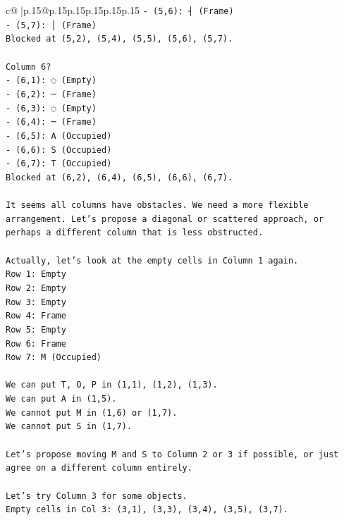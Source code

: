 \documentclass{article}
\begin{document}
{\begin{supertabular}{c@{$\;$}|p{.15\linewidth}@{}p{.15\linewidth}p{.15\linewidth}p{.15\linewidth}p{.15\linewidth}p{.15\linewidth}}
{{{\texttt{{-} (5,6): ┤ (Frame)} \\
\texttt{{-} (5,7): │ (Frame)} \\
\texttt{Blocked at (5,2), (5,4), (5,5), (5,6), (5,7).} \\
\\ 
\texttt{Column 6?} \\
\texttt{{-} (6,1): ◌ (Empty)} \\
\texttt{{-} (6,2): ─ (Frame)} \\
\texttt{{-} (6,3): ◌ (Empty)} \\
\texttt{{-} (6,4): ─ (Frame)} \\
\texttt{{-} (6,5): A (Occupied)} \\
\texttt{{-} (6,6): S (Occupied)} \\
\texttt{{-} (6,7): T (Occupied)} \\
\texttt{Blocked at (6,2), (6,4), (6,5), (6,6), (6,7).} \\
\\ 
\texttt{It seems all columns have obstacles. We need a more flexible arrangement. Let's propose a diagonal or scattered approach, or perhaps a different column that is less obstructed.} \\
\\ 
\texttt{Actually, let's look at the empty cells in Column 1 again.} \\
\texttt{Row 1: Empty} \\
\texttt{Row 2: Empty} \\
\texttt{Row 3: Empty} \\
\texttt{Row 4: Frame} \\
\texttt{Row 5: Empty} \\
\texttt{Row 6: Frame} \\
\texttt{Row 7: M (Occupied)} \\
\\ 
\texttt{We can put T, O, P in (1,1), (1,2), (1,3).} \\
\texttt{We can put A in (1,5).} \\
\texttt{We cannot put M in (1,6) or (1,7).} \\
\texttt{We cannot put S in (1,7).} \\
\\ 
\texttt{Let's propose moving M and S to Column 2 or 3 if possible, or just agree on a different column entirely.} \\
\\ 
\texttt{Let's try Column 3 for some objects.} \\
\texttt{Empty cells in Col 3: (3,1), (3,3), (3,4), (3,5), (3,7).} \\
}}}
\end{supertabular}}
\end{document}
